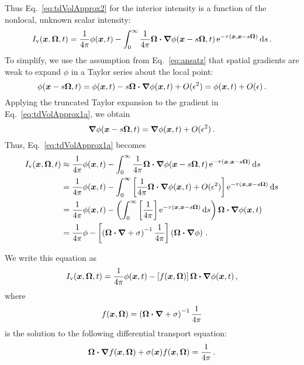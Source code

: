 Thus Eq.~\eqref{eq:tdVolApprox2} for the interior intensity is a function of the
nonlocal, unknown scalar intensity:
\begin{equation}\label{eq:tdVolApprox1a}
  I_\mathrm{v}(\bm{x},\bm{\Omega},t) = \frac{1}{4\pi} \phi(\bm{x},t) - 
     \int_{0}^{\infty}
    \frac{1}{4\pi} \bm{\Omega}\bm{\cdot} \bm{\nabla} \phi(\bm{x} - s \bm{\Omega}, t)
    \mathop{}\!\mathrm{e}^{ -\tau(\bm{x}, \bm{x} - s \bm{\Omega})}
    \mathop{}\!\mathrm{d} s \,.
\end{equation}
To simplify, we use the assumption from Eq.~\eqref{eq:ansatz} that spatial
gradients are weak to expand $\phi$ in a Taylor series about the local
point:
\begin{equation} \label{eq:taylorPhi}
  \phi(\bm{x} - s \bm{\Omega}, t)
  = \phi(\bm{x},t) - s\bm{\Omega} \bm{\cdot}
  \bm{\nabla}\phi (\bm{x}, t) + O(\epsilon^2) = \phi(\bm{x},t) +
  O(\epsilon) \,.
\end{equation}
Applying the truncated Taylor expansion to the gradient in
Eq.~\eqref{eq:tdVolApprox1a}, we obtain
\begin{equation*}
  \bm{\nabla} \phi(\bm{x}-s\bm{\Omega},t)
  = \bm{\nabla} \phi(\bm{x},t) + O(\epsilon^2)\,.
\end{equation*}
Thus, Eq.~\eqref{eq:tdVolApprox1a} becomes
\begin{align*}\nonumber
  I_\mathrm{v}(\bm{x},\bm{\Omega},t) &\approx \frac{1}{4\pi} \phi(\bm{x},t) - 
     \int_{0}^{\infty}
    \frac{1}{4\pi} \bm{\Omega}\bm{\cdot} \bm{\nabla} \phi(\bm{x} - s \bm{\Omega}, t)
    \mathop{}\!\mathrm{e}^{ -\tau(\bm{x}, \bm{x} - s \bm{\Omega})}
    \mathop{}\!\mathrm{d} s
\\
  &= \frac{1}{4\pi} \phi(\bm{x},t) - \int_{0}^{\infty}
    \left[ \frac1{4\pi}\bm{\Omega}\bm{\cdot} \bm{\nabla} \phi(\bm{x},t) + O(\epsilon^2) \right]
    \mathop{}\!\mathrm{e}^{ -\tau(\bm{x}, \bm{x} - s \bm{\Omega})}
    \mathop{}\!\mathrm{d} s
  \\ \nonumber
  &= \frac{1}{4\pi} \phi (\bm{x},t) - \left( \int_{0}^{\infty}
    \left[ \frac1{4\pi}\right]
    \mathop{}\!\mathrm{e}^{ -\tau(\bm{x}, \bm{x} - s \bm{\Omega})} \mathop{}\!\mathrm{d} s \right)
    \bm{\Omega}\bm{\cdot} \bm{\nabla} \phi(\bm{x},t)
  \\
  &= \frac{1}{4\pi} \phi - 
  \left[\left(\bm{\Omega}\bm{\cdot} \bm{\nabla}  + \sigma \right)^{-1}
   \frac{1}{4\pi}\right] \left( \bm{\Omega}\bm{\cdot} \bm{\nabla} \phi \right) \,.
\end{align*}

We write this equation as
\begin{equation}\label{eq:tdVolApproxFinal}
  I_\mathrm{v}(\bm{x},\bm{\Omega},t)
  = \frac{1}{4\pi} \phi (\bm{x},t)
  - \left[ f(\bm{x}, \bm{\Omega}) \right] \bm{\Omega}\bm{\cdot} \bm{\nabla} \phi(\bm{x},t)\,,
\end{equation}
where
\begin{equation*}
  f(\bm{x},\bm{\Omega}) = \left(\bm{\Omega}\bm{\cdot} \bm{\nabla}  + \sigma \right)^{-1}
  \frac{1}{4\pi}
\end{equation*}
is the solution to the following differential transport equation:
\begin{equation} \label{eq:fVol}
  \bm{\Omega}\bm{\cdot} \bm{\nabla} f(\bm{x}, \bm{\Omega})
  + \sigma(\bm{x}) f (\bm{x}, \bm{\Omega})
= \frac{1}{4\pi} \,.
\end{equation}


